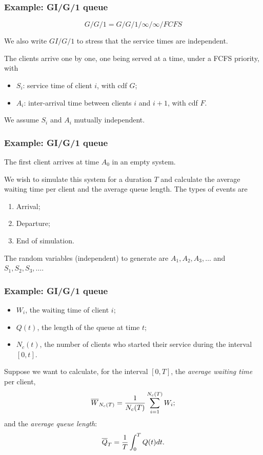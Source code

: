 \documentclass[t,usepdftitle=false,aspectratio=169]{beamer}
\begin{document}
\begin{frame}
\frametitle{Example: GI/G/1 queue}

$$
G/G/1 = G/G/1/\infty/\infty/FCFS
$$

We also write $GI/G/1$ to stress that the service times are independent.

\mbox{}

The clients arrive one by one, one being served at a time, under a FCFS priority, with
\begin{itemize}
\item
${S_i}$: service time of client $i$, with cdf $G$;
\item
${A_i}$: inter-arrival time between clients $i$ and $i+1$, with cdf $F$.
\end{itemize}
We assume $S_i$ and $A_i$ mutually independent.

\end{frame}

\begin{frame}
	\frametitle{Example: GI/G/1 queue}
	
	The first client arrives at time ${A_0}$ in an empty system.
	
	\mbox{}
	
	We wish to simulate this system for a duration ${T}$ and calculate the average waiting time per client and the average queue length. The types of events are
	\begin{enumerate}
		\item Arrival;
		\item Departure;
		\item End of simulation.
	\end{enumerate}
	The random variables (independent) to generate are $A_1, A_2, A_3, \dots$ and $S_1, S_2, S_3, \dots$.
	
\end{frame}

\begin{frame}
	\frametitle{Example: GI/G/1 queue}
	
	\begin{itemize}
		\item ${W_i}$, the waiting time of client $i$;
		\item ${Q(t)}$, the length of the queue at time $t$;
		\item ${N_c(t)}$, the number of clients who started their service during the interval $[0,t]$.
	\end{itemize}
	Suppose we want to calculate, for the interval $[0,T]$, the \emph{average waiting time} per client,
	$${\overline{W}_{N_c(T)}} = {1\over N_c(T)} \sum_{i=1}^{N_c(T)} W_i;$$
	and the \emph{average queue length}:
	$${\overline{Q}_T} = {1\over T} \int_0^T Q(t) dt.$$
	
\end{frame}
\end{document}

